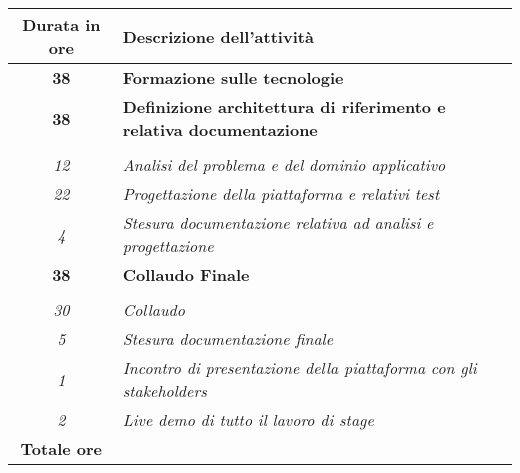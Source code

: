 
\begin{tabularx}{\textwidth}{|c|X|}
	\hline
	\textbf{Durata in ore} & \textbf{Descrizione dell'attività} \\\hline
	
	\textbf{38} & \textbf{Formazione sulle tecnologie} \\	 
    \hline
    
    \textbf{38} & \textbf{Definizione architettura di riferimento e relativa documentazione} \\ \hdashline 
    \multirow{3}{0cm}\\ 
    \textit{12} & 
    \textit{Analisi del problema e del dominio applicativo} \\
    \textit{22} & 
    \textit{Progettazione della piattaforma e relativi test} \\
    \textit{4} & 
    \textit{Stesura documentazione relativa ad analisi e progettazione} \\
    \hline
    
    \textbf{38} & \textbf{Collaudo Finale}  \\ \hdashline 
    \multirow{4}{0cm}\\ 
    \textit{30} & 
    \textit{Collaudo} \\
    \textit{5} & 
    \textit{Stesura documentazione finale} \\
    \textit{1} & 
    \textit{Incontro di presentazione della piattaforma con gli stakeholders} \\
    \textit{2} & 
    \textit{Live demo di tutto il lavoro di stage} \\
    \hline
	
	\textbf{Totale ore} & \multicolumn{1}{|c|}{\textbf{\totaleOre}} \\\hline
\end{tabularx}
